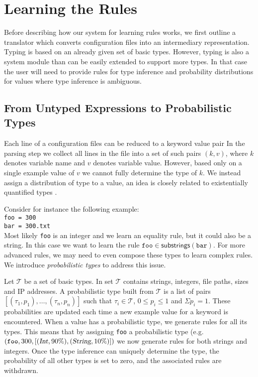 \section{Learning the Rules}
\label{sec:system}

Before describing how our system for learning rules works, we first outline a translator which converts configuration files into an intermediary representation. Typing is based on an
already given set of basic types. However, typing is also a system module than can be easily extended to support
more types. In that case the user will need to provide rules for type inference and probability distributions for values where type inference is ambiguous.

\subsection{From Untyped Expressions to Probabilistic Types}

Each line of a configuration files can be reduced to a keyword value pair
In the parsing step we collect all lines in the file into a set of such pairs $(k, v)$, where $k$ denotes 
variable name and $v$ denotes variable value. 
However, based only on a single example value of $v$ we cannot fully determine the type of $k$.
We instead assign a distribution of type to a value, an idea is closely related to existentially quantified types \cite{Launchbury93lazyfunctional}.

Consider for instance the following example:\\
\texttt{\hspace*{2em}foo = 300\\
\hspace*{2em}bar = 300.txt}\\
Most likely \texttt{foo} is an integer and we learn an equality rule, but it could also be a string.
In this case we want to learn the rule $ \texttt{foo} \in \textsf{substrings}(\texttt{bar})$. 
For more advanced rules, we may need to even compose these types to learn complex rules.
We introduce {\emph{probabilistic types}} to address this issue.

Let $\mathcal{T}$ be a set of basic types. In \app set $\mathcal{T}$ contains strings, integers, file paths, sizes and IP addresses. 
A probabilistic type built from $\mathcal{T}$ is a list of pairs $[(\tau_1, p_1),\ldots,(\tau_n, p_n)]$ such that $\tau_i \in \mathcal{T}$, 
$0 \le p_i \le 1$ 
and $\Sigma p_i = 1$. These probabilities are updated each time a new example value for a keyword is encountered.
When a value has a probabilistic type, we generate rules for all its types. This means that by assigning {\texttt{foo}} a probabilistic type 
(e.g. $(\texttt{foo}, 300, [(\textsl{Int},90\%),(\textsl{String},10\%)])$
we now generate rules for both strings and integers.
Once the type inference can uniquely determine the type, the probability of all other types is set to zero, and the associated rules are withdrawn.


